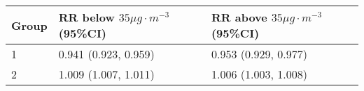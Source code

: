 \begin{tabular}{lll}
  \hline
Group & RR below $35 \mu g \cdot m^{-3}$ (95\%CI) & RR above $35 \mu g \cdot m^{-3}$ (95\%CI) \\ 
  \hline
   1 & 0.941 (0.923, 0.959) & 0.953 (0.929, 0.977) \\ 
     2 & 1.009 (1.007, 1.011) & 1.006 (1.003, 1.008) \\ 
   \hline
\end{tabular}

